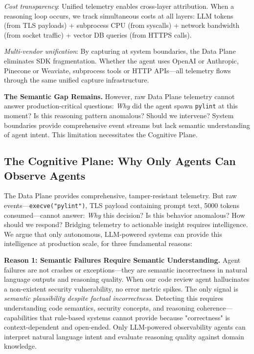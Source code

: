 \documentclass[sigplan,screen,9pt]{acmart}
\begin{document}
\emph{Cost transparency}: Unified telemetry enables cross-layer attribution. When a reasoning loop occurs, we track simultaneous costs at all layers: LLM tokens (from TLS payloads) + subprocess CPU (from syscalls) + network bandwidth (from socket traffic) + vector DB queries (from HTTPS calls).

\emph{Multi-vendor unification}: By capturing at system boundaries, the Data Plane eliminates SDK fragmentation. Whether the agent uses OpenAI or Anthropic, Pinecone or Weaviate, subprocess tools or HTTP APIs—all telemetry flows through the same unified capture infrastructure.

\textbf{The Semantic Gap Remains.} However, raw Data Plane telemetry cannot answer production-critical questions: \emph{Why} did the agent spawn \texttt{pylint} at this moment? Is this reasoning pattern anomalous? Should we intervene? System boundaries provide comprehensive event streams but lack semantic understanding of agent intent. This limitation necessitates the Cognitive Plane.

\subsection{The Cognitive Plane: Why Only Agents Can Observe Agents}

The Data Plane provides comprehensive, tamper-resistant telemetry. But raw events—\texttt{execve("pylint")}, TLS payload containing prompt text, 5000 tokens consumed—cannot answer: \emph{Why} this decision? Is this behavior anomalous? How should we respond? Bridging telemetry to actionable insight requires intelligence. We argue that only autonomous, LLM-powered systems can provide this intelligence at production scale, for three fundamental reasons:

\textbf{Reason 1: Semantic Failures Require Semantic Understanding.} Agent failures are not crashes or exceptions—they are semantic incorrectness in natural language outputs and reasoning quality. When our code review agent hallucinates a non-existent security vulnerability, no error metric spikes. The only signal is \emph{semantic plausibility despite factual incorrectness}. Detecting this requires understanding code semantics, security concepts, and reasoning coherence—capabilities that rule-based systems cannot provide because "correctness" is context-dependent and open-ended. Only LLM-powered observability agents can interpret natural language intent and evaluate reasoning quality against domain knowledge.
\end{document}
